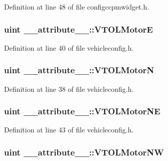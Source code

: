Definition at line 48 of file configccpmwidget.\-h.

\hypertarget{group___config_plugin_ga98abc446e1dcba498787f381659f6b2d}{
\subsubsection[{V\-T\-O\-L\-Motor\-E}]{\setlength{\rightskip}{0pt plus 5cm}uint \-\_\-\-\_\-attribute\-\_\-\-\_\-\-::\-V\-T\-O\-L\-Motor\-E}}\label{group___config_plugin_ga98abc446e1dcba498787f381659f6b2d}


Definition at line 40 of file vehicleconfig.\-h.

\hypertarget{group___config_plugin_ga2f7517413dcc58e5033f5b558c2645b6}{
\subsubsection[{V\-T\-O\-L\-Motor\-N}]{\setlength{\rightskip}{0pt plus 5cm}uint \-\_\-\-\_\-attribute\-\_\-\-\_\-\-::\-V\-T\-O\-L\-Motor\-N}}\label{group___config_plugin_ga2f7517413dcc58e5033f5b558c2645b6}


Definition at line 38 of file vehicleconfig.\-h.

\hypertarget{group___config_plugin_gab2efff1f0b5cdb98443f986d78f75691}{
\subsubsection[{V\-T\-O\-L\-Motor\-N\-E}]{\setlength{\rightskip}{0pt plus 5cm}uint \-\_\-\-\_\-attribute\-\_\-\-\_\-\-::\-V\-T\-O\-L\-Motor\-N\-E}}\label{group___config_plugin_gab2efff1f0b5cdb98443f986d78f75691}


Definition at line 43 of file vehicleconfig.\-h.

\hypertarget{group___config_plugin_gaad074461234c2de58881eb8f2923e6e7}{
\subsubsection[{V\-T\-O\-L\-Motor\-N\-W}]{\setlength{\rightskip}{0pt plus 5cm}uint \-\_\-\-\_\-attribute\-\_\-\-\_\-\-::\-V\-T\-O\-L\-Motor\-N\-W}}\label{group___config_plugin_gaad074461234c2de58881eb8f2923e6e7}


